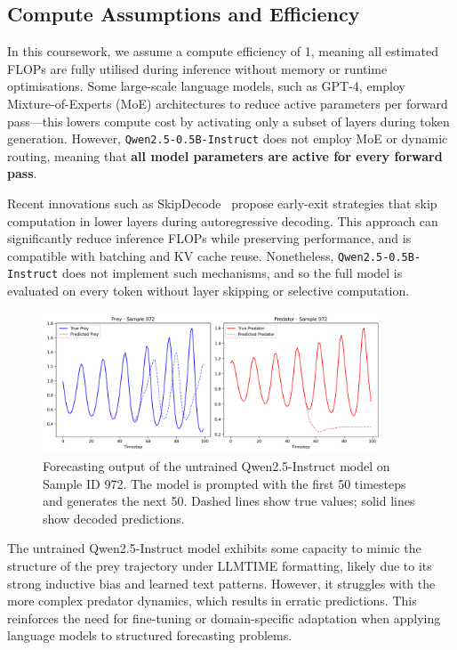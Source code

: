 \documentclass[a4paper,12pt]{article}
\begin{document}
  \subsection*{Compute Assumptions and Efficiency}

  In this coursework, we assume a compute efficiency of 1, meaning all estimated FLOPs are fully utilised during inference without memory or runtime optimisations. Some large-scale language models, such as GPT-4, employ Mixture-of-Experts (MoE) architectures to reduce active parameters per forward pass—this lowers compute cost by activating only a subset of layers during token generation. However, \texttt{Qwen2.5-0.5B-Instruct} does not employ MoE or dynamic routing, meaning that \textbf{all model parameters are active for every forward pass}.
  
  Recent innovations such as SkipDecode~\cite{delcorro2023skipdecode} propose early-exit strategies that skip computation in lower layers during autoregressive decoding. This approach can significantly reduce inference FLOPs while preserving performance, and is compatible with batching and KV cache reuse. Nonetheless, \texttt{Qwen2.5-0.5B-Instruct} does not implement such mechanisms, and so the full model is evaluated on every token without layer skipping or selective computation.
  
  \begin{figure}[h]
      \centering
      \includegraphics[width=0.9\textwidth]{sample972_untrained.png}
      \caption{Forecasting output of the untrained Qwen2.5-Instruct model on Sample ID 972. The model is prompted with the first 50 timesteps and generates the next 50. Dashed lines show true values; solid lines show decoded predictions.}
      \label{fig:sample972_untrained}
  \end{figure}
  
  The untrained Qwen2.5-Instruct model exhibits some capacity to mimic the structure of the prey trajectory under LLMTIME formatting, likely due to its strong inductive bias and learned text patterns. However, it struggles with the more complex predator dynamics, which results in erratic predictions. This reinforces the need for fine-tuning or domain-specific adaptation when applying language models to structured forecasting problems.
  
\end{document}
